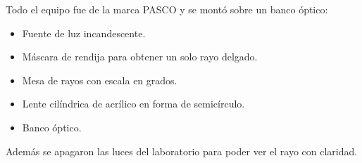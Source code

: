 Todo el equipo fue de la marca PASCO y se montó sobre un banco óptico:
\begin{itemize}
\item Fuente de luz incandescente.
\item Máscara de rendija para obtener un solo rayo delgado.
\item Mesa de rayos con escala en grados.
\item Lente cilíndrica de acrílico en forma de semicírculo.
\item Banco óptico.
\end{itemize}
Además se apagaron las luces del laboratorio para poder ver el rayo con claridad.
